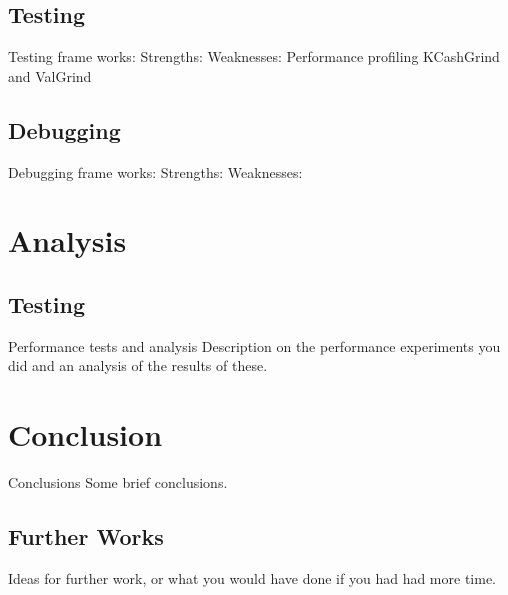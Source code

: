 \documentclass[a4paper,11pt]{article}
\begin{document}
\subsection{Testing}

Testing frame works: 
Strengths:
Weaknesses: 
Performance profiling KCashGrind and ValGrind

\subsection{Debugging}

Debugging frame works: 
Strengths:
Weaknesses: 
 
 \section{Analysis}
 
 \subsection{Testing}
Performance tests and analysis Description on the performance experiments you did and an analysis
of the results of these.
 
 \section{Conclusion}
Conclusions Some brief conclusions.
 
\subsection{Further Works}
 Ideas for further work, or what you would have done if you had had more time.
\end{document}
